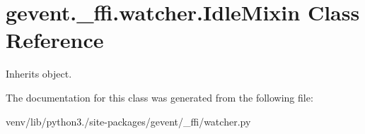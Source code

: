 \hypertarget{classgevent_1_1__ffi_1_1watcher_1_1_idle_mixin}{}\section{gevent.\+\_\+ffi.\+watcher.\+Idle\+Mixin Class Reference}
\label{classgevent_1_1__ffi_1_1watcher_1_1_idle_mixin}


Inherits object.



The documentation for this class was generated from the following file\+:\begin{DoxyCompactItemize}
\item 
venv/lib/python3./site-\/packages/gevent/\+\_\+ffi/watcher.\+py\end{DoxyCompactItemize}
